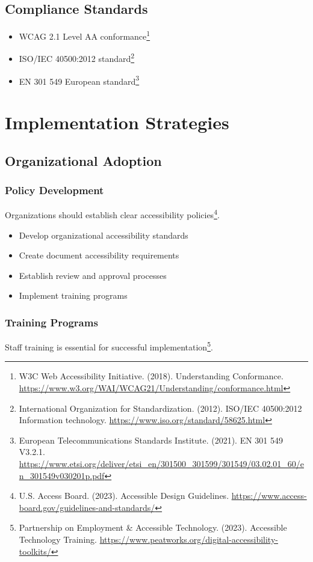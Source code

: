\subsection{Compliance Standards}
\begin{itemize}
\item WCAG 2.1 Level AA conformance\footnote{W3C Web Accessibility Initiative. (2018). Understanding Conformance. \url{https://www.w3.org/WAI/WCAG21/Understanding/conformance.html}}
\item ISO/IEC 40500:2012 standard\footnote{International Organization for Standardization. (2012). ISO/IEC 40500:2012 Information technology. \url{https://www.iso.org/standard/58625.html}}
\item EN 301 549 European standard\footnote{European Telecommunications Standards Institute. (2021). EN 301 549 V3.2.1. \url{https://www.etsi.org/deliver/etsi_en/301500_301599/301549/03.02.01_60/en_301549v030201p.pdf}}
\end{itemize}

\section{Implementation Strategies}
\label{sec:implementation-strategies}

\subsection{Organizational Adoption}

\subsubsection{Policy Development}
Organizations should establish clear accessibility policies\footnote{U.S. Access Board. (2023). Accessible Design Guidelines. \url{https://www.access-board.gov/guidelines-and-standards/}}.

\begin{itemize}
\item Develop organizational accessibility standards
\item Create document accessibility requirements
\item Establish review and approval processes
\item Implement training programs
\end{itemize}

\subsubsection{Training Programs}
Staff training is essential for successful implementation\footnote{Partnership on Employment \& Accessible Technology. (2023). Accessible Technology Training. \url{https://www.peatworks.org/digital-accessibility-toolkits/}}.

